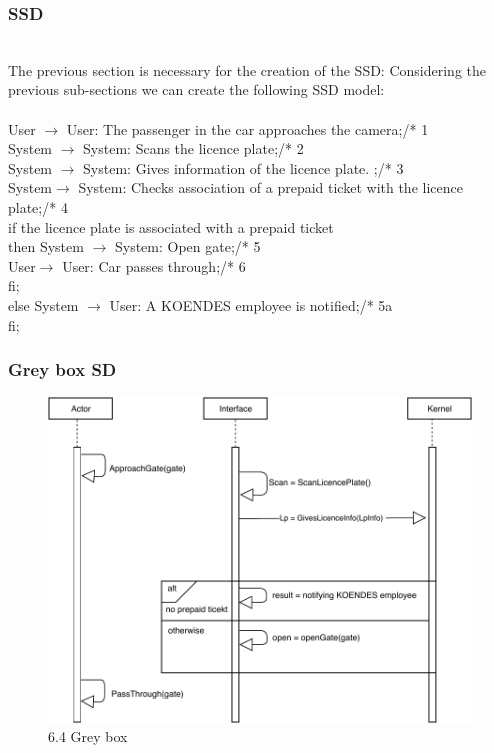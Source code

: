 \subsubsection{SSD}
\creator{\studentB}
\\
The previous section is necessary for the creation of the SSD: Considering the previous sub-sections we can create the following SSD model:\\\\
User $\rightarrow$ User: The passenger in the car approaches the camera;\hfill /* 1\\
System $\rightarrow$ System: Scans the licence plate;\hfill /* 2\\
System $\rightarrow$ System: Gives information of the licence plate.
;\hfill /* 3\\
System$\rightarrow$ System: Checks association of a prepaid ticket with the licence plate;\hfill /* 4\\
if the licence plate is associated with a prepaid ticket\\
then System $\rightarrow$ System: Open gate;\hfill /* 5\\
\phantom{x}\hspace{2ex}User$\rightarrow$ User: Car passes through;\hfill /* 6\\
\phantom{x}\hspace{2ex}fi;\\
else System $\rightarrow$ User: A KOENDES employee is notified;\hfill /* 5a\\
fi;\\

\newpage
\subsubsection{Grey box SD}
\creator{\studentA}
\begin{figure}[H]
    \centering
    \includegraphics[width=\textwidth]{Iteration_3/Files/UC4_gb.pdf}
    \caption{6.4 Grey box}
    \label{fig:6.2 Greybox}
\end{figure}


